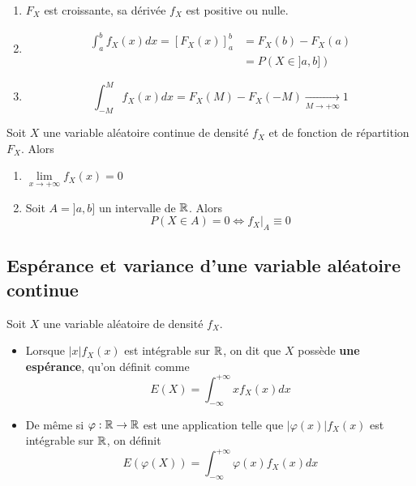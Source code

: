\documentclass[a4paper, 12pt]{article}
\begin{document}
\begin{demonstration}
    \begin{enumerate}
        \item $F_X$ est croissante, sa dérivée $f_X$ est positive ou nulle.
        \item 
        \begin{align*}
            \int_a^b f_X(x)dx = [F_X(x)]_a^b &= F_X(b) - F_X(a) \\
            &= P(X \in ]a, b])
        \end{align*}
        \item
        $$
        \int_{-M}^M f_X(x)dx = F_X(M) - F_X(-M) \underset{M \to +\infty}{\to} 1
        $$
    \end{enumerate}
\end{demonstration}

\begin{corollaire}{}{}
    Soit $X$ une variable aléatoire continue de densité $f_X$ et de fonction de répartition $F_X$. Alors
    \begin{enumerate}
        \item $\lim\limits_{x \to +\infty} f_X(x) = 0$
        \item Soit $A = ]a, b]$ un intervalle de $\mathbb{R}$. Alors
        $$
        P(X \in A) = 0 \iff f_X|_A \equiv 0
        $$
    \end{enumerate}
\end{corollaire}

\subsection{Espérance et variance d'une variable aléatoire continue}

\begin{definition}
    Soit $X$ une variable aléatoire de densité $f_X$.
    \begin{itemize}
        \item Lorsque $|x| f_X(x)$ est intégrable sur $\mathbb{R}$, on dit
        que $X$ possède \textbf{une espérance}, qu'on définit comme
        $$
        E(X) = \int_{-\infty}^{+\infty} x f_X(x) dx
        $$
        \item De même si $\varphi: \mathbb{R} \to \mathbb{R}$ est une application telle que
        $|\varphi(x)| f_X(x)$ est intégrable sur $\mathbb{R}$, on définit
        $$
        E(\varphi(X)) = \int_{-\infty}^{+\infty} \varphi(x) f_X(x) dx
        $$
    \end{itemize}
\end{definition}
\end{document}
